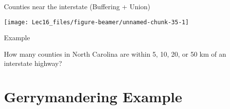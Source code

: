 \documentclass[11pt,ignorenonframetext,]{beamer}
\newenvironment{Shaded}{}{}
\newcommand{\DataTypeTok}[1]{\textcolor[rgb]{0.56,0.13,0.00}{#1}}
\newcommand{\DecValTok}[1]{\textcolor[rgb]{0.25,0.63,0.44}{#1}}
\newcommand{\FloatTok}[1]{\textcolor[rgb]{0.25,0.63,0.44}{#1}}
\newcommand{\KeywordTok}[1]{\textcolor[rgb]{0.00,0.44,0.13}{\textbf{#1}}}
\newcommand{\NormalTok}[1]{#1}
\newcommand{\OperatorTok}[1]{\textcolor[rgb]{0.40,0.40,0.40}{#1}}
\newcommand{\StringTok}[1]{\textcolor[rgb]{0.25,0.44,0.63}{#1}}
\let\oldShaded\Shaded
\let\endoldShaded\endShaded
\renewenvironment{Shaded}{\footnotesize\begin{spacing}{0.9}\oldShaded}{\endoldShaded\end{spacing}}
\let\oldverbatim\verbatim
\let\endoldverbatim\endverbatim
\newcommand{\scriptoutput}{
  \renewenvironment{Shaded}{\scriptsize\begin{spacing}{0.9}\oldShaded}{\endoldShaded\end{spacing}}
  \renewenvironment{verbatim}{\scriptsize\begin{spacing}{0.9}\oldverbatim}{\endoldverbatim\end{spacing}}
}
\begin{document}
\begin{frame}[fragile,t]{Counties near the interstate (Buffering +
Union)}
\protect\hypertarget{counties-near-the-interstate-buffering-union}{}

\scriptoutput

\begin{Shaded}
\end{Shaded}

\begin{center}\texttt{[image: Lec16\_files/figure-beamer/unnamed-chunk-35-1]} \end{center}

\end{frame}

\begin{frame}[t]{Example}
\protect\hypertarget{example}{}

How many counties in North Carolina are within 5, 10, 20, or 50 km of an
interstate highway?

\end{frame}

\hypertarget{gerrymandering-example}{%
\section{Gerrymandering Example}\label{gerrymandering-example}}
\end{document}
